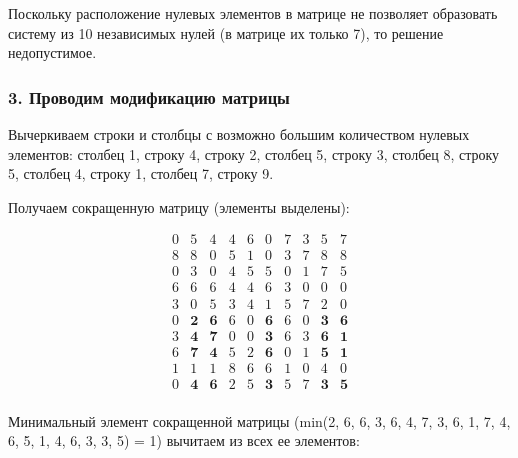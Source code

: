 \documentclass[17pt]{extarticle}
\begin{document}
Поскольку расположение нулевых элементов в матрице не позволяет образовать систему из 10 независимых нулей (в матрице их только 7), то решение недопустимое.

\subsubsection*{3. Проводим модификацию матрицы}

Вычеркиваем строки и столбцы с возможно большим количеством нулевых элементов: столбец 1, строку 4, строку 2, столбец 5, строку 3, столбец 8, строку 5, столбец 4, строку 1, столбец 7, строку 9.

Получаем сокращенную матрицу (элементы выделены):

\[
    \begin{array}{*{10}{c}}
        0 & 5          & 4          & 4 & 6 & 0          & 7 & 3 & 5          & 7          \\
        8 & 8          & 0          & 5 & 1 & 0          & 3 & 7 & 8          & 8          \\
        0 & 3          & 0          & 4 & 5 & 5          & 0 & 1 & 7          & 5          \\
        6 & 6          & 6          & 4 & 4 & 6          & 3 & 0 & 0          & 0          \\
        3 & 0          & 5          & 3 & 4 & 1          & 5 & 7 & 2          & 0          \\
        0 & \textbf{2} & \textbf{6} & 6 & 0 & \textbf{6} & 6 & 0 & \textbf{3} & \textbf{6} \\
        3 & \textbf{4} & \textbf{7} & 0 & 0 & \textbf{3} & 6 & 3 & \textbf{6} & \textbf{1} \\
        6 & \textbf{7} & \textbf{4} & 5 & 2 & \textbf{6} & 0 & 1 & \textbf{5} & \textbf{1} \\
        1 & 1          & 1          & 8 & 6 & 6          & 1 & 0 & 4          & 0          \\
        0 & \textbf{4} & \textbf{6} & 2 & 5 & \textbf{3} & 5 & 7 & \textbf{3} & \textbf{5} \\
    \end{array}
\]

Минимальный элемент сокращенной матрицы (min(2, 6, 6, 3, 6, 4, 7, 3, 6, 1, 7, 4, 6, 5, 1, 4, 6, 3, 3, 5) = 1) вычитаем из всех ее элементов:
\end{document}
